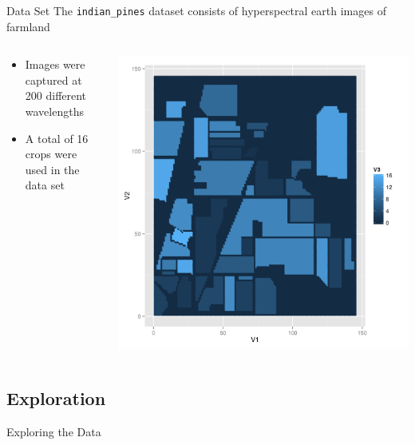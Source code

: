 \documentclass[11pt]{beamer}
\begin{document}
\begin{frame}{Data Set}
The \texttt{indian\_pines} dataset consists of hyperspectral earth images of farmland
\begin{columns}[T]
\begin{column}{.48\textwidth}
\begin{itemize}
\item Images were captured at 200 different wavelengths
\item A total of 16 crops were used in the data set
\end{itemize}
\end{column}
\hfill
\begin{column}{.48\textwidth}
\includegraphics[scale=.3]{gt.png}
\end{column}
\end{columns}
\end{frame}

\subsection{Exploration}
\begin{frame}{Exploring the Data}
\begin{center}
\end{center}
\end{frame}
\end{document}

